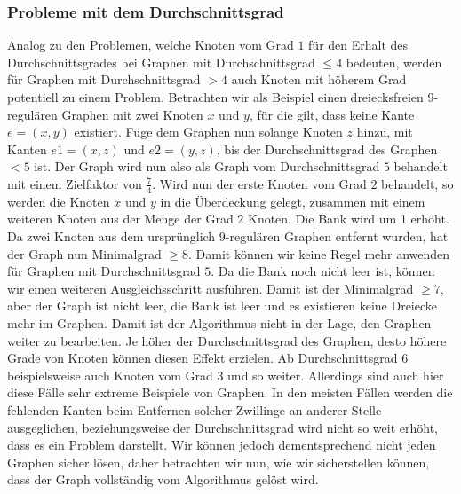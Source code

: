 \documentclass[12pt,onecolumn, notitlepage]{scrartcl}
\begin{document}
\subsubsection{Probleme mit dem Durchschnittsgrad}
Analog zu den Problemen, welche Knoten vom Grad $1$ für den Erhalt des Durchschnittsgrades bei Graphen mit Durchschnittsgrad $\leq 4$ bedeuten, werden für Graphen mit Durchschnittsgrad $> 4$ auch Knoten mit höherem Grad potentiell zu einem Problem. Betrachten wir als Beispiel einen dreiecksfreien $9$-regulären Graphen mit zwei Knoten $x$ und $y$, für die gilt, dass keine Kante $e = (x,y)$ existiert. Füge dem Graphen nun solange Knoten $z$ hinzu, mit Kanten $e1 = (x,z)$ und $e2 = (y,z)$, bis der Durchschnittsgrad des Graphen $< 5$ ist. \newline\newline
Der Graph wird nun also als Graph vom Durchschnittsgrad $5$ behandelt mit einem Zielfaktor von $\frac{7}{4}$. Wird nun der erste Knoten vom Grad $2$ behandelt, so werden die Knoten $x$ und $y$ in die Überdeckung gelegt, zusammen mit einem weiteren Knoten aus der Menge der Grad $2$ Knoten. Die Bank wird um 1 erhöht. Da zwei Knoten aus dem ursprünglich $9$-regulären Graphen entfernt wurden, hat der Graph nun Minimalgrad $\geq 8$. Damit können wir keine Regel mehr anwenden für Graphen mit Durchschnittsgrad $5$. Da die Bank noch nicht leer ist, können wir einen weiteren Ausgleichsschritt ausführen. Damit ist der Minimalgrad $\geq 7$, aber der Graph ist nicht leer, die Bank ist leer und es existieren keine Dreiecke mehr im Graphen. Damit ist der Algorithmus nicht in der Lage, den Graphen weiter zu bearbeiten. \newline
Je höher der Durchschnittsgrad des Graphen, desto höhere Grade von Knoten können diesen Effekt erzielen. Ab Durchschnittsgrad $6$ beispielsweise auch Knoten vom Grad $3$ und so weiter. 
Allerdings sind auch hier diese Fälle sehr extreme Beispiele von Graphen. In den meisten Fällen werden die fehlenden Kanten beim Entfernen solcher Zwillinge an anderer Stelle ausgeglichen, beziehungsweise der Durchschnittsgrad wird nicht so weit erhöht, dass es ein Problem darstellt.
Wir können jedoch dementsprechend nicht jeden Graphen sicher lösen, daher betrachten wir nun, wie wir sicherstellen können, dass der Graph vollständig vom Algorithmus gelöst wird. \newline
\end{document}

